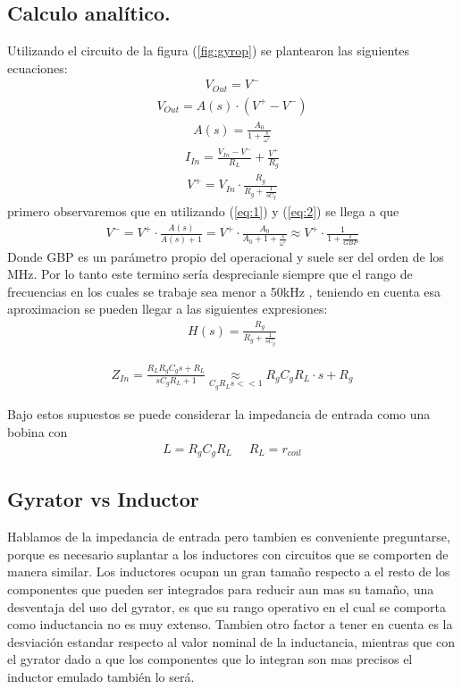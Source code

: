 \documentclass[a4paper]{article}
\begin{document}
\subsection{Calculo analítico.}
Utilizando el circuito de la figura (\ref{fig:gyrop}) se plantearon las siguientes ecuaciones:
\begin{align}   V_{Out} = V^- \label{eq:1}\end{align}
\begin{align} V_{Out} = A(s) \cdot (V^+-V^-)\label{eq:2}\end{align}
\begin{align} A(s)= \frac{A_0}{1+\frac{s}{\omega'}}\end{align}
\begin{align} I_{In}=\frac{V_{In}-V^-}{R_L}+\frac{V^+}{R_g}\end{align}
\begin{align} V^+=V_{In}\cdot \frac{R_g}{R_g+\frac{1}{sC_g}} \end{align}
primero observaremos que en utilizando (\ref{eq:1}) y (\ref{eq:2}) se llega a que 
\begin{align}V^- =V^+ \cdot \frac{A(s)}{A(s)+1} = V^+ \cdot \frac{A_0}{A_0+1+\frac{s}{\omega'}} \approx V^+ \cdot \frac{1}{1+\frac{s}{GBP}} \label{eq:desp}   \end{align}
Donde GBP es un parámetro propio del operacional y suele ser del orden de los MHz. Por lo tanto este termino sería desprecianle siempre que el rango de frecuencias en los cuales se trabaje sea menor a 50kHz
, teniendo en cuenta esa aproximacion se pueden llegar a las siguientes expresiones:
\begin{align}H(s)= \frac{R_g}{R_g+\frac{1}{sC_g}} \end{align}


\begin{align}Z_{In}=\frac{R_LR_gC_gs+R_L}{sC_gR_L+1}\underset{C_gR_Ls << 1}{\approx}R_gC_gR_L \cdot s + R_g 
\label{eq:Zintrans}
\end{align}

Bajo estos supuestos se puede considerar la impedancia de entrada como una bobina con 
\begin{align}  L=R_gC_gR_L  \ \ \ \ \ \  R_L=r_{coil} \label{eq:basicL1}\end{align}
\flushleft
\subsection{Gyrator vs Inductor}
Hablamos de la impedancia de entrada pero tambien es conveniente preguntarse, porque es necesario suplantar a los inductores con circuitos que se comporten de manera similar.
Los inductores ocupan un gran tamaño respecto a el resto de los componentes que pueden ser integrados para reducir aun mas su tamaño, una desventaja del uso del gyrator, es que su rango operativo en el cual se comporta como inductancia no es muy extenso. Tambien otro factor a tener en cuenta es la desviación estandar respecto al valor nominal de la inductancia, mientras que con el gyrator dado a que los componentes que lo integran son mas precisos el inductor emulado también lo será.
\end{document}
